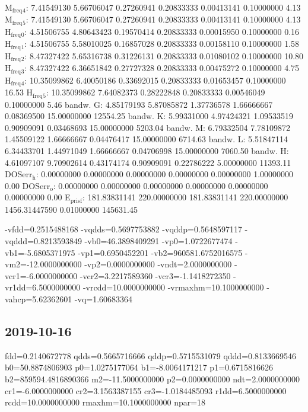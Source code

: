 \documentclass[11pt]{article}
\begin{document}
M\(_{\text{freq}}\)\(_{\text{4}}\):   7.41549130   5.66706047   0.27260941   0.20833333   0.00413141   0.10000000         4.13
M\(_{\text{freq}}\)\(_{\text{5}}\):   7.41549130   5.66706047   0.27260941   0.20833333   0.00413141   0.10000000         4.13
H\(_{\text{freq}}\)\(_{\text{0}}\):   4.51506755   4.80643423   0.19570414   0.20833333   0.00015950   0.10000000         0.16
H\(_{\text{freq}}\)\(_{\text{1}}\):   4.51506755   5.58010025   0.16857028   0.20833333   0.00158110   0.10000000         1.58
H\(_{\text{freq}}\)\(_{\text{2}}\):   8.47327422   5.65316738   0.31226131   0.20833333   0.01080102   0.10000000        10.80
H\(_{\text{freq}}\)\(_{\text{3}}\):   8.47327422   6.36651842   0.27727328   0.20833333   0.00475272   0.10000000         4.75
H\(_{\text{freq}}\)\(_{\text{4}}\):  10.35099862   6.40050186   0.33692015   0.20833333   0.01653457   0.10000000        16.53
H\(_{\text{freq}}\)\(_{\text{5}}\):  10.35099862   7.64082373   0.28222848   0.20833333   0.00546049   0.10000000         5.46
bandw. G:   4.85179193   5.87085872   1.37736578   1.66666667   0.08369500  15.00000000     12554.25
bandw. K:   5.99331000   4.97424321   1.09533519   0.90909091   0.03468693  15.00000000      5203.04
bandw. M:   6.79332504   7.78109872   1.45509122   1.66666667   0.04476417  15.00000000      6714.63
bandw. L:   5.51847114   6.34433701   1.44971049   1.66666667   0.04706998  15.00000000      7060.50
bandw. H:   4.61097107   9.70902614   0.43174174   0.90909091   0.22786222   5.00000000     11393.11
DOSerr\(_{\text{h}}\):   0.00000000   0.00000000   0.00000000   0.00000000   0.00000000   1.00000000         0.00
DOSerr\(_{\text{o}}\):   0.00000000   0.00000000   0.00000000   0.00000000   0.00000000   0.00000000         0.00
E\(_{\text{pris}}\)\(_{\text{f}}\): 181.83831141 220.00000000 181.83831141 220.00000000 1456.31447590   0.01000000    145631.45


-vfdd=0.2515488168 -vqdds=0.5697753882 -vqddp=0.5648597117 -vqddd=0.8213593849 -vb0=46.3898409291 -vp0=1.0722677474 -vb1=-5.6805371975 -vp1=0.6950452201 -vb2=960581.6752016575 -vm2=-12.0000000000 -vp2=0.0000000000 -vndt=2.0000000000 -vcr1=-6.0000000000 -vcr2=3.2217589360 -vcr3=-1.1418272350
 -vr1dd=6.5000000000 -vrcdd=10.0000000000 -vrmaxhm=10.1000000000 -vahcp=5.62362601 -vq=1.60683364
\subsection{2019-10-16}
\label{sec:org7465642}
fdd=0.2140672778 qdds=0.5665716666 qddp=0.5715531079 qddd=0.8133669546 b0=50.8874806903 p0=1.0275177064 b1=-8.0064171217 p1=0.6715816626 b2=859594.4816890366 m2=-11.5000000000 p2=0.0000000000 ndt=2.0000000000 cr1=-6.0000000000 cr2=3.1563387155 cr3=-1.0184485093 r1dd=6.5000000000 rcdd=10.0000000000 rmaxhm=10.1000000000 npar=18 
\end{document}
